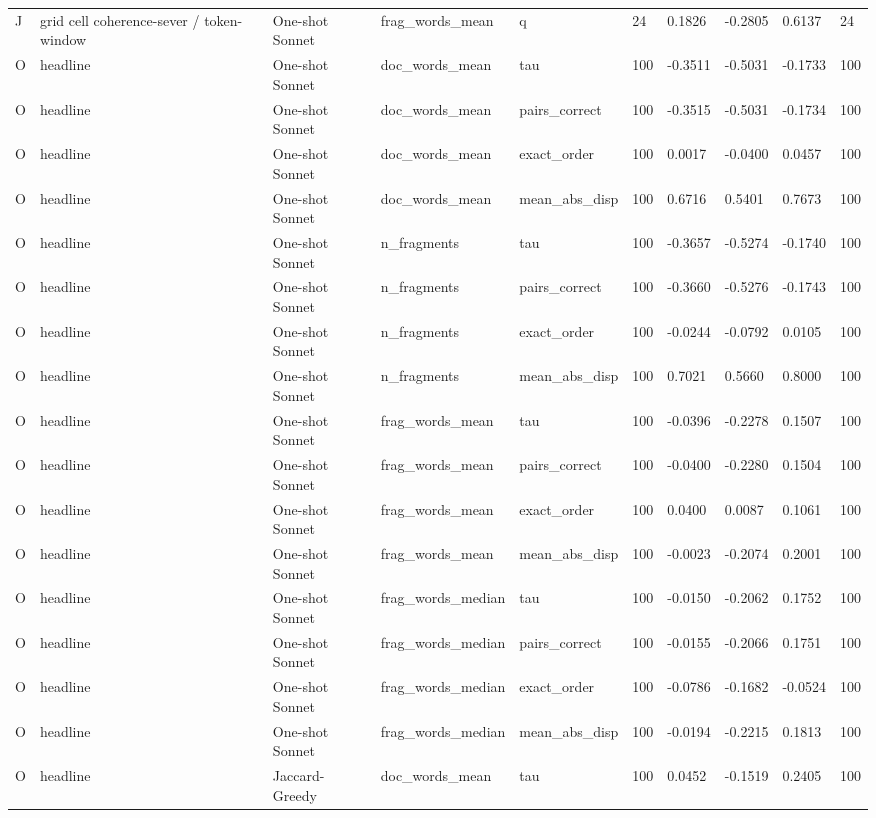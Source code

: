 \begin{table}[t]
{\begin{tabular}{llllllllll}
J & grid cell coherence-sever / token-window & One-shot Sonnet & frag\_words\_mean & q & 24 & 0.1826 & -0.2805 & 0.6137 & 24 \\
O & headline & One-shot Sonnet & doc\_words\_mean & tau & 100 & -0.3511 & -0.5031 & -0.1733 & 100 \\
O & headline & One-shot Sonnet & doc\_words\_mean & pairs\_correct & 100 & -0.3515 & -0.5031 & -0.1734 & 100 \\
O & headline & One-shot Sonnet & doc\_words\_mean & exact\_order & 100 & 0.0017 & -0.0400 & 0.0457 & 100 \\
O & headline & One-shot Sonnet & doc\_words\_mean & mean\_abs\_disp & 100 & 0.6716 & 0.5401 & 0.7673 & 100 \\
O & headline & One-shot Sonnet & n\_fragments & tau & 100 & -0.3657 & -0.5274 & -0.1740 & 100 \\
O & headline & One-shot Sonnet & n\_fragments & pairs\_correct & 100 & -0.3660 & -0.5276 & -0.1743 & 100 \\
O & headline & One-shot Sonnet & n\_fragments & exact\_order & 100 & -0.0244 & -0.0792 & 0.0105 & 100 \\
O & headline & One-shot Sonnet & n\_fragments & mean\_abs\_disp & 100 & 0.7021 & 0.5660 & 0.8000 & 100 \\
O & headline & One-shot Sonnet & frag\_words\_mean & tau & 100 & -0.0396 & -0.2278 & 0.1507 & 100 \\
O & headline & One-shot Sonnet & frag\_words\_mean & pairs\_correct & 100 & -0.0400 & -0.2280 & 0.1504 & 100 \\
O & headline & One-shot Sonnet & frag\_words\_mean & exact\_order & 100 & 0.0400 & 0.0087 & 0.1061 & 100 \\
O & headline & One-shot Sonnet & frag\_words\_mean & mean\_abs\_disp & 100 & -0.0023 & -0.2074 & 0.2001 & 100 \\
O & headline & One-shot Sonnet & frag\_words\_median & tau & 100 & -0.0150 & -0.2062 & 0.1752 & 100 \\
O & headline & One-shot Sonnet & frag\_words\_median & pairs\_correct & 100 & -0.0155 & -0.2066 & 0.1751 & 100 \\
O & headline & One-shot Sonnet & frag\_words\_median & exact\_order & 100 & -0.0786 & -0.1682 & -0.0524 & 100 \\
O & headline & One-shot Sonnet & frag\_words\_median & mean\_abs\_disp & 100 & -0.0194 & -0.2215 & 0.1813 & 100 \\
O & headline & Jaccard-Greedy & doc\_words\_mean & tau & 100 & 0.0452 & -0.1519 & 0.2405 & 100 \\

\end{tabular}}
\end{table}
